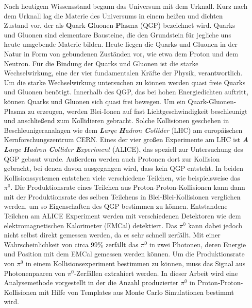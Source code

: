 Nach heutigem Wissensstand begann das Universum mit dem Urknall.
Kurz nach dem Urknall lag die Materie des Universums in einem heißen und dichten Zustand vor, der als \textbf{Q}uark-\textbf{G}luonen-\textbf{P}lasma (QGP) bezeichnet wird.
Quarks und Gluonen sind elementare Bausteine, die den Grundstein für jegliche uns heute umgebende Materie bilden.
Heute liegen die Quarks und Gluonen in der Natur in Form von gebundenen Zuständen vor, wie etwa dem Proton und dem Neutron.
\newline
Für die Bindung der Quarks und Gluonen ist die starke Wechselwirkung, eine der vier fundamentalen Kräfte der Physik, verantwortlich.
Um die starke Wechselwirkung untersuchen zu können werden quasi freie Quarks und Gluonen benötigt.
Innerhalb des QGP, das bei hohen Energiedichten auftritt, können Quarks und Gluonen sich quasi frei bewegen.
\newline
Um ein Quark-Gluonen-Plasma zu erzeugen, werden Blei-Ionen auf fast Lichtgeschwindigkeit beschleunigt und anschließend zum Kollidieren gebracht.
Solche Kollisionen geschehen in Beschleunigeranalagen wie dem \textit{\textbf{L}arge \textbf{H}adron \textbf{C}ollider} (LHC) am europäischen Kernforschungszentrum CERN.
Eines der vier großen Experimente am LHC ist \textit{\textbf{A} \textbf{L}arge \textbf{H}adron \textbf{C}ollider \textbf{E}xperiment} (ALICE), das speziell zur Untersuchung des QGP gebaut wurde.
\newline
Außerdem werden auch Protonen dort zur Kollision gebracht, bei denen davon ausgegangen wird, dass kein QGP entsteht.
In beiden Kollisionssystemen entstehen viele verschiedene Teilchen, wie beispielsweise das $\pi^{0}$.
Die Produktionsrate eines Teilchen aus Proton-Proton-Kollisionen kann dann mit der Produktionsrate des selben Teilchens in Blei-Blei-Kollisionen verglichen werden, um so Eigenschaften des QGP bestimmen zu können.
\newline
Entstandene Teilchen am ALICE Experiment werden mit verschiedenen Detektoren wie dem elektromagnetischen Kalorimeter (EMCal) detektiert.
Das $\pi^{0}$ kann dabei jedoch nicht selbst direkt gemessen werden, da es sehr schnell zerfällt.
Mit einer Wahrscheinlichkeit von circa $99\%$ zerfällt das $\pi^{0}$ in zwei Photonen, deren Energie und Position mit dem EMCal gemessen werden können.
Um die Produktionsrate von $\pi^{0}$ in einem Kollisionsexperiment bestimmen zu können, muss das Signal aus Photonenpaaren von $\pi^{0}$-Zerfällen extrahiert werden.
\newline
In dieser Arbeit wird eine Analysemethode vorgestellt in der die Anzahl produzierter $\pi^{0}$ in Proton-Proton-Kollisionen mit Hilfe von Templates aus Monte Carlo Simulationen bestimmt wird.
